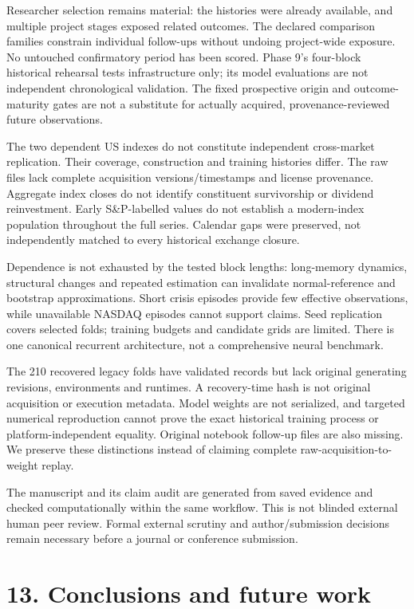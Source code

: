 \documentclass[11pt]{article}
\begin{document}
Researcher selection remains material: the histories were already available, and multiple project stages exposed related outcomes. The declared comparison families constrain individual follow-ups without undoing project-wide exposure. No untouched confirmatory period has been scored. Phase 9's four-block historical rehearsal tests infrastructure only; its model evaluations are not independent chronological validation. The fixed prospective origin and outcome-maturity gates are not a substitute for actually acquired, provenance-reviewed future observations.

The two dependent US indexes do not constitute independent cross-market replication. Their coverage, construction and training histories differ. The raw files lack complete acquisition versions/timestamps and license provenance. Aggregate index closes do not identify constituent survivorship or dividend reinvestment. Early S\&P-labelled values do not establish a modern-index population throughout the full series. Calendar gaps were preserved, not independently matched to every historical exchange closure.

Dependence is not exhausted by the tested block lengths: long-memory dynamics, structural changes and repeated estimation can invalidate normal-reference and bootstrap approximations. Short crisis episodes provide few effective observations, while unavailable NASDAQ episodes cannot support claims. Seed replication covers selected folds; training budgets and candidate grids are limited. There is one canonical recurrent architecture, not a comprehensive neural benchmark.

The 210 recovered legacy folds have validated records but lack original generating revisions, environments and runtimes. A recovery-time hash is not original acquisition or execution metadata. Model weights are not serialized, and targeted numerical reproduction cannot prove the exact historical training process or platform-independent equality. Original notebook follow-up files are also missing. We preserve these distinctions instead of claiming complete raw-acquisition-to-weight replay.

The manuscript and its claim audit are generated from saved evidence and checked computationally within the same workflow. This is not blinded external human peer review. Formal external scrutiny and author/submission decisions remain necessary before a journal or conference submission.

\section*{13. Conclusions and future work}
\end{document}

